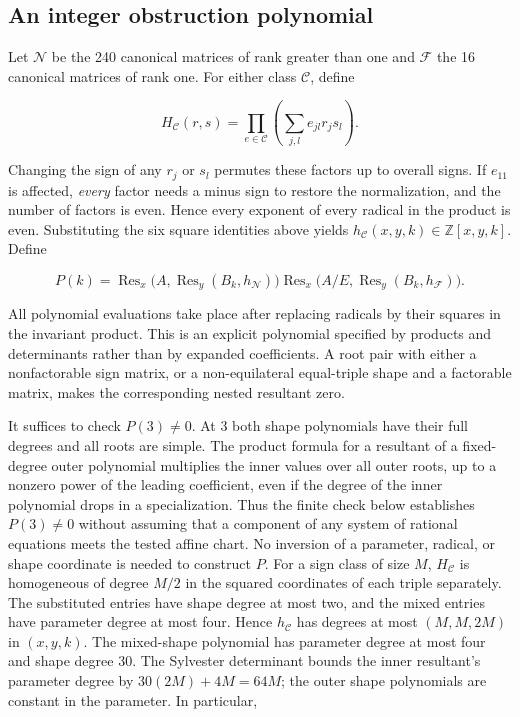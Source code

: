 \documentclass[11pt,letterpaper]{article}
\theoremstyle{definition}
\begin{document}
\subsection*{An integer obstruction polynomial}

Let \(\mathcal N\) be the 240 canonical matrices of rank greater than one and \(\mathcal F\) the 16 canonical matrices of rank one. For either class \(\mathcal C\), define

\[
H_{\mathcal C}(r,s)=
\prod_{e\in\mathcal C}\left(\sum_{j,l} e_{jl}r_js_l\right).
\]

Changing the sign of any \(r_j\) or \(s_l\) permutes these factors up to overall signs. If \(e_{11}\) is affected, \emph{every} factor needs a minus sign to restore the normalization, and the number of factors is even. Hence every exponent of every radical in the product is even. Substituting the six square identities above yields \(h_{\mathcal C}(x,y,k)\in\mathbb Z[x,y,k]\). Define

\[
P(k)=\operatorname{Res}_x\big(A,\operatorname{Res}_y(B_k,h_{\mathcal N})\big)
\operatorname{Res}_x\big(A/E,\operatorname{Res}_y(B_k,h_{\mathcal F})\big).
\]

All polynomial evaluations take place after replacing radicals by their squares in the invariant product. This is an explicit polynomial specified by products and determinants rather than by expanded coefficients. A root pair with either a nonfactorable sign matrix, or a non-equilateral equal-triple shape and a factorable matrix, makes the corresponding nested resultant zero.

It suffices to check \(P(3)\ne0\). At 3 both shape polynomials have their full degrees and all roots are simple. The product formula for a resultant of a fixed-degree outer polynomial multiplies the inner values over all outer roots, up to a nonzero power of the leading coefficient, even if the degree of the inner polynomial drops in a specialization. Thus the finite check below establishes \(P(3)\ne0\) without assuming that a component of any system of rational equations meets the tested affine chart. No inversion of a parameter, radical, or shape coordinate is needed to construct \(P\). For a sign class of size \(M\), \(H_{\mathcal C}\) is homogeneous of degree \(M/2\) in the squared coordinates of each triple separately. The substituted entries have shape degree at most two, and the mixed entries have parameter degree at most four. Hence \(h_{\mathcal C}\) has degrees at most \((M,M,2M)\) in \((x,y,k)\). The mixed-shape polynomial has parameter degree at most four and shape degree 30. The Sylvester determinant bounds the inner resultant's parameter degree by \(30(2M)+4M=64M\); the outer shape polynomials are constant in the parameter. In particular,
\end{document}
